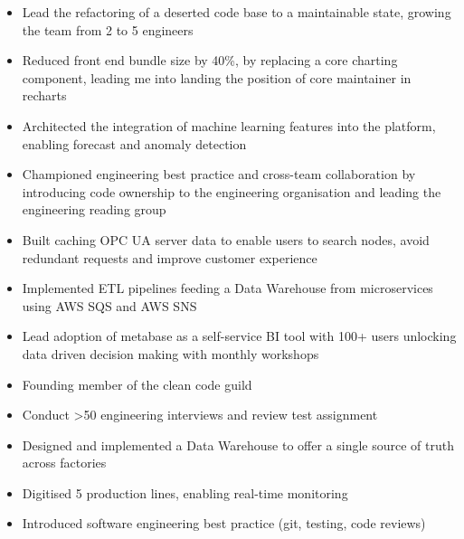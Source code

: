 \documentclass[10pt,a4paper,ragged2e,withhyper]{altacv}
\begin{document}
\begin{paracol}{2}


\begin{itemize}
\item Lead the refactoring of a deserted code base to a maintainable state, growing the team from 2 to 5 engineers
\item Reduced front end bundle size by 40\%, by replacing a core charting component, leading me into landing the position of core maintainer in recharts
\item Architected the integration of machine learning features into the platform, enabling forecast and anomaly detection
\item Championed engineering best practice and cross-team collaboration by introducing code ownership to the engineering organisation and leading the engineering reading group
\item Built caching OPC UA server data to enable users to search nodes, avoid redundant requests and improve customer experience
\end{itemize}


\divider

\begin{itemize}
\item Implemented ETL pipelines feeding a Data Warehouse from microservices using AWS SQS and AWS SNS
\item Lead adoption of metabase as a self-service BI tool with 100+ users unlocking data driven decision making with monthly workshops
\item Founding member of the clean code guild
\item Conduct >50 engineering interviews and review test assignment
\end{itemize}


\divider

\begin{itemize}
\item Designed and implemented a Data Warehouse to offer a single source of truth across factories
\item Digitised 5 production lines, enabling real-time monitoring
\item Introduced software engineering best practice (git, testing, code reviews)
\end{itemize}


\end{paracol}
\end{document}
